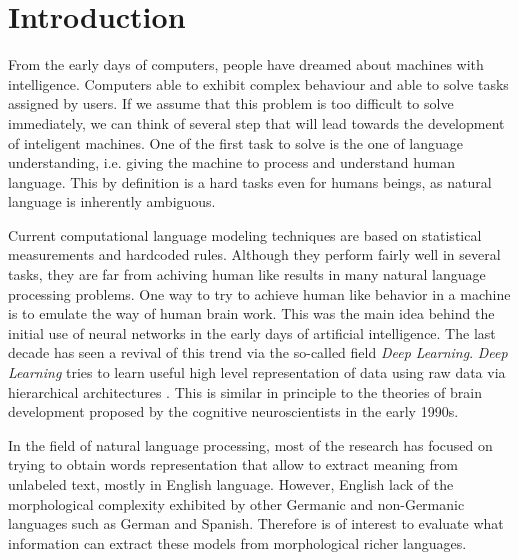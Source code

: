 \chapter{Introduction}
\label{chapter:Introduction}


From the early days of computers, people have dreamed about machines with intelligence. Computers able to exhibit complex behaviour and able to solve tasks assigned by users. If we assume that this problem is too difficult to solve immediately,  we can think of several step that will lead towards the development of inteligent machines. One of the first task to solve  is the one of language understanding, i.e. giving the machine to process and understand human language. This by definition is a hard tasks even for humans beings, as  natural language is inherently ambiguous.

Current computational language modeling techniques are based on statistical measurements and hardcoded rules. Although they perform fairly well in several tasks, they are far from achiving human like results in many natural language processing problems.
One way to try to achieve human like behavior in a machine is to emulate the way of human brain work. This was the main idea behind the initial use of neural networks in the early days  of artificial intelligence. The last decade has seen a revival of this trend via the so-called field \textit{Deep Learning}. \textit{Deep Learning} tries to learn useful high level representation of data using raw data via hierarchical architectures . This is similar in principle to the theories of brain development proposed by the cognitive neuroscientists in the early 1990s. 

In the field of natural language processing, most of the research  has focused on  trying to obtain words representation that allow to extract meaning from unlabeled text, mostly in English language.  However,  English lack of the morphological complexity exhibited by other Germanic and non-Germanic languages such as German and Spanish. Therefore is of interest to evaluate what information can extract these models from morphological richer languages. 



% 


